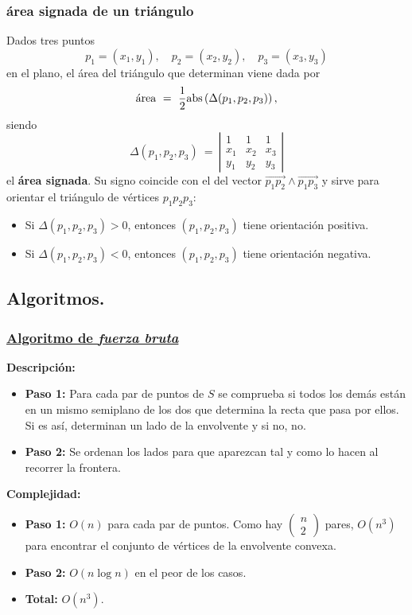 \documentclass[twoside]{report}
\begin{document}
\subsubsection{área signada de un triángulo}

\noindent Dados tres puntos $$p_1=(x_1,y_1), \quad p_2=(x_2,y_2), \quad p_3=(x_3,y_3)$$ en el plano, el área del triángulo que determinan viene dada por
$$\mbox{área} \ = \ \frac{1}{2} {\rm abs}\left(\Delta(p_1,p_2,p_3)\right),$$
siendo $$\Delta(p_1,p_2,p_3) \ = \ \left| \begin{array}{ccc}
1 & 1 & 1 \\
x_1 & x_2 & x_3 \\
y_1 & y_2 & y_3
\end{array}
\right|$$
el \textbf{área signada}. Su signo coincide con el del vector $\overrightarrow{p_1p_2}\wedge\overrightarrow{p_1p_3}$ y sirve para orientar el triángulo
de vértices $p_1p_2p_3$:
\begin{itemize}
   \item Si $\Delta(p_1,p_2,p_3)>0$, entonces $(p_1,p_2,p_3)$ tiene orientación positiva.
   \item Si $\Delta(p_1,p_2,p_3)<0$, entonces $(p_1,p_2,p_3)$ tiene orientación negativa.
\end{itemize}

\subsection{Algoritmos.}

\subsubsection{\underline{Algoritmo de {\it \textbf{fuerza bruta}}}}

{\bf Descripción:}

\begin{itemize}
  \item \textbf{Paso 1:} Para cada par de puntos de $S$ se comprueba si todos los
demás están en un mismo semiplano de los dos que determina la
recta que pasa por ellos. Si es así, determinan un lado de la
envolvente y si no, no.
  \item \textbf{Paso 2:} Se ordenan los lados para que aparezcan tal y
como lo hacen al recorrer la frontera.
\end{itemize}


{\bf Complejidad:}

\begin{itemize}
  \item \textbf{Paso 1:} $O(n)$ para cada par de puntos. Como hay
$\left(\begin{array}{c}n\\2\end{array}\right)$ pares, $O(n^3)$
para encontrar el conjunto de vértices de la envolvente convexa.
  \item \textbf{Paso 2:} $O(n\log n)$ en el peor de los casos.
  \item \textbf{Total:} $O(n^3)$.
\end{itemize}
\end{document}
